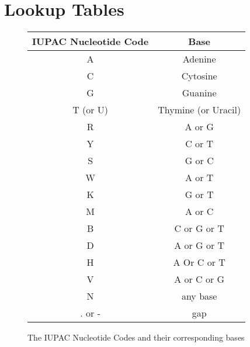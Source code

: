 \documentclass[a4]{article}
\begin{document}
\appendix
\section{Lookup Tables}
	\begin{figure}[h]
		\centering
		\begin{tabular}{cc}
			\hline
			IUPAC Nucleotide Code & Base \\ 
			\hline
			A & Adenine \\ 
			C & Cytosine \\ 
			G & Guanine \\ 
			T (or U) & Thymine (or Uracil) \\ 
			R & A or G \\ 
			Y & C or T \\ 
			S & G or C \\ 
			W & A or T \\ 
			K & G or T \\ 
			M & A or C \\ 
			B & C or G or T \\ 
			D & A or G or T \\ 
			H & A Or C or T \\ 
			V & A or C or G \\ 
			N & any base \\ 
			. or - & gap\\
			\hline
		\end{tabular}
		\caption{The IUPAC Nucleotide Codes and their corresponding bases}
		\label{nucleotideCodeTable}
	\end{figure} 
\end{document}
